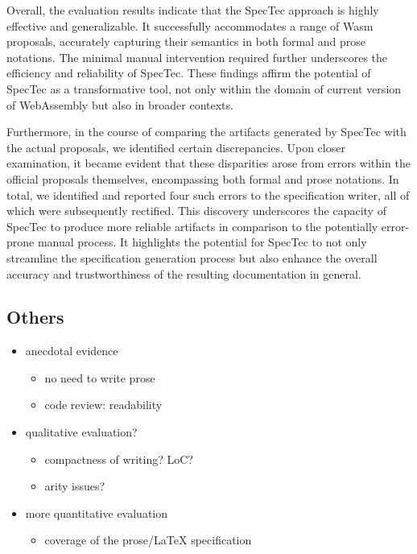 Overall, the evaluation results indicate that the SpecTec approach is highly
effective and generalizable. It successfully accommodates a range of Wasm
proposals, accurately capturing their semantics in both formal and prose
notations. The minimal manual intervention required further underscores the
efficiency and reliability of SpecTec. These findings affirm the potential of
SpecTec as a transformative tool, not only within the domain of current version
of WebAssembly but also in broader contexts.

Furthermore, in the course of comparing the artifacts generated by SpecTec with
the actual proposals, we identified certain discrepancies. Upon closer
examination, it became evident that these disparities arose from errors within
the official proposals themselves, encompassing both formal and prose
notations. In total, we identified and reported four such errors to the
specification writer, all of which were subsequently rectified. This discovery
underscores the capacity of SpecTec to produce more reliable artifacts in
comparison to the potentially error-prone manual process. It highlights the
potential for SpecTec to not only streamline the specification generation
process but also enhance the overall accuracy and trustworthiness of the
resulting documentation in general.

\subsection{Others}
\begin{itemize}
\item anecdotal evidence
\begin{itemize}
\item no need to write prose
\item code review: readability
\end{itemize}

\item qualitative evaluation?
\begin{itemize}
\item compactness of writing? LoC?
\item arity issues?
\end{itemize}

\item more quantitative evaluation
\begin{itemize}
\item coverage of the prose/LaTeX specification
\end{itemize}
\end{itemize}
